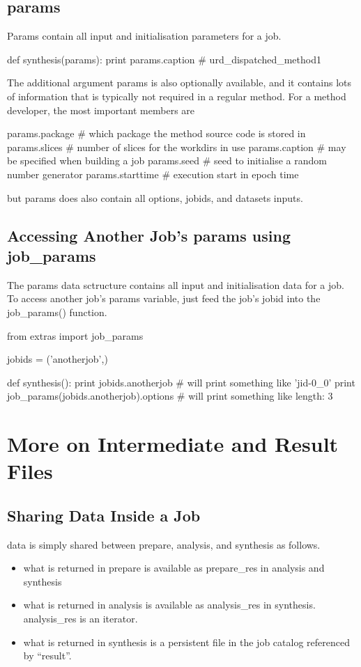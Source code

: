 \subsection{params}
Params contain all input and initialisation parameters for a job.

\begin{python}
def synthesis(params):
  print params.caption
# urd_dispatched_method1
\end{python}
The additional argument params is also optionally available, and it
contains lots of information that is typically not required in a
regular method.  For a method developer, the most important members
are

\begin{python}
params.package     # which package the method source code is stored in
params.slices      # number of slices for the workdirs in use
params.caption     # may be specified when building a job
params.seed        # seed to initialise a random number generator
params.starttime   # execution start in epoch time
\end{python}
but params does also contain all options, jobids, and datasets inputs.



\subsection{Accessing Another Job's params using job\_params}

The params data sctructure contains all input and initialisation data
for a job.  To access another job's params variable, just feed the
job's jobid into the job\_params() function.

\begin{python}
from extras import job_params

jobids = ('anotherjob',)

def synthesis():
  print jobids.anotherjob
  # will print something like 'jid-0_0'
  print job_params(jobids.anotherjob).options
  # will print something like {length: 3}
\end{python}




\newpage
\section{More on Intermediate and Result Files}

\subsection{Sharing Data Inside a Job}
data is simply shared between prepare, analysis, and synthesis as follows.
\begin{itemize}
\item what is returned in prepare is available as prepare\_res in analysis and synthesis
\item what is returned in analysis is available as analysis\_res in synthesis.  analysis\_res is an iterator.
\item what is returned in synthesis is a persistent file in the job catalog referenced by ``result''.
\end{itemize}

